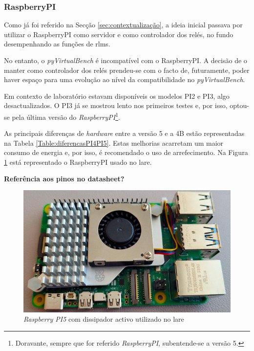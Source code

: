 \subsubsection{RaspberryPI}
Como já foi referido na Secção \ref{sec:contextualização}, a ideia inicial passava por utilizar o \gls{RaspberryPI} como servidor e como controlador dos relés, no fundo desempenhando as funções de \acrshort{rlms}.

No entanto, o \textit{pyVirtualBench} é incompatível com o \gls{RaspberryPI}. A decisão de o manter como controlador dos relés prendeu-se com o facto de, futuramente, poder haver espaço para uma evolução ao nível da compatibilidade no \textit{pyVirtualBench}.

Em contexto de laboratório estavam disponíveis os modelos PI2 e PI3, algo desactualizados. O PI3 já se mostrou lento nos primeiros testes e, por isso, optou-se pela última versão do \textit{RaspberryPI}\footnote{Doravante, sempre que for referido \textit{RaspberryPI}, subentende-se a versão 5.}.

As principais diferenças de \textit{hardware} entre a versão 5 e a 4B estão representadas na Tabela \ref{Table:diferencasPI4PI5}. Estas melhorias acarretam um maior consumo de energia e, por isso, é recomendado o uso de arrefecimento. Na Figura \ref{fig:pi5dissipador} está representado o \gls{RaspberryPI} usado no \acrshort{lare}.

\textbf{Referência aos pinos no datasheet?}

\begin{figure}[hbtp]
    \centering
    \includegraphics[width=1\textwidth]{figures/pi5_dissipador.png}
    \caption{\textit{Raspberry PI5} com dissipador activo utilizado no \acrshort{lare}}
    \label{fig:pi5dissipador}
\end{figure}

